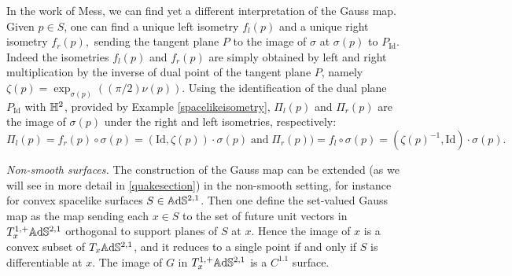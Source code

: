     \begin{observation}\label{DiafGauss}
        In the work of Mess, we can find yet a different interpretation of the Gauss map. Given $p\in S$, one can find a unique left isometry $f_l(p)$ and a unique right isometry $f_r(p),$ sending the tangent plane $P$ to the image of $\sigma$ at $\sigma(p)$ to $P_{\text{Id}}$. Indeed the isometries $f_l(p)$ and $f_r(p)$ are simply obtained by left and right multiplication by the inverse of dual point of the tangent plane $P$, namely $\zeta(p)=\exp_{\sigma(p)}((\pi/2)\nu(p))$. Using the identification of the dual plane $P_{\text{Id}}$ with $\mathbb{H}^2$, provided by Example \ref{spacelikeisometry}, $\Pi_l(p)$ and $\Pi_r(p)$ are the image of $\sigma(p)$ under the right and left isometries, respectively:
        \[
        \Pi_l(p)=f_r(p)\circ\sigma(p)=(\text{Id},\zeta(p))\cdot \sigma(p)\;\text{and}\;\Pi_r(p))=f_l\circ\sigma(p)=(\zeta(p)^{-1},\text{Id})\cdot\sigma(p).
        \]
    \end{observation}





\textit{Non-smooth surfaces.} The construction of the Gauss map can be extended (as we will see in more detail in \ref{quakesection}) in the non-smooth setting, for instance for convex spacelike surfaces $S\in\mathbb{A}\mathrm{d}\mathbb{S}^{2,1}$. Then one define the set-valued Gauss map as the map sending each $x\in S$ to the set of future unit vectors in $T_x^{1,+}\mathbb{A}\mathrm{d}\mathbb{S}^{2,1}$ orthogonal to support planes of $S$ at $x$. Hence the image of $x$ is a convex subset of $T_x\mathbb{A}\mathrm{d}\mathbb{S}^{2,1}$, and it reduces to a single point if and only if $S$ is differentiable at $x$. The image of $G$ in $T^{1,+}_x\mathbb{A}\mathrm{d}\mathbb{S}^{2,1}$ is a $C^{1.1}$ surface. \\

